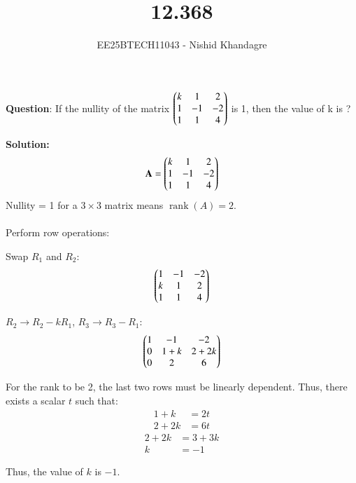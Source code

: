 \documentclass[journal]{IEEEtran}
\title{12.368}
\author{EE25BTECH11043 - Nishid Khandagre}
\begin{document}
\maketitle

\renewcommand{\thefigure}{\theenumi}
\renewcommand{\thetable}{\theenumi}


\textbf{Question}:
If the nullity of the matrix
$\begin{pmatrix}k & 1 & 2 \\ 1 & -1 & -2 \\ 1 & 1 & 4\end{pmatrix}$
is 1, then the value of k is ?

\textbf{Solution: }
\begin{align}
\mathbf{A}=\begin{pmatrix}k & 1 & 2 \\ 1 & -1 & -2 \\ 1 & 1 & 4\end{pmatrix}
\end{align}
Nullity = 1 for a $3 \times 3$ matrix means $\operatorname{rank}(A)=2$.\\ \\
Perform row operations:

Swap $R_1$ and $R_2$:
\begin{align}
\begin{pmatrix}1 & -1 & -2 \\ k & 1 & 2 \\ 1 & 1 & 4\end{pmatrix}
\end{align}

$R_2 \rightarrow R_2 - kR_1$, $R_3 \rightarrow R_3 - R_1$:
\begin{align}
\begin{pmatrix}1 & -1 & -2 \\ 0 & 1+k & 2+2k \\ 0 & 2 & 6\end{pmatrix}
\end{align}

For the rank to be 2, the last two rows must be linearly dependent.
Thus, there exists a scalar $t$ such that:
\begin{align}
1+k &= 2t \\
2+2k &= 6t
\end{align}
\begin{align}
2+2k &= 3+3k \\
k &= -1
\end{align}

Thus, the value of $k$ is $-1$.
\end{document}
